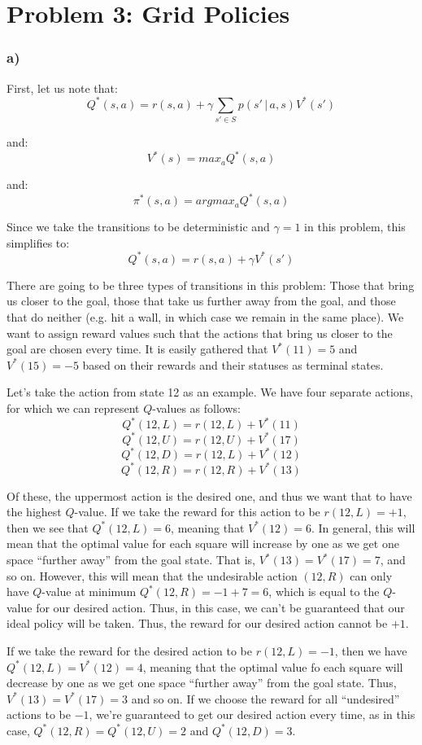 \documentclass[11pt]{scrartcl}
\begin{document}
\section*{Problem 3: Grid Policies}
\subsubsection*{a)}
First, let us note that:
$$Q^{*}(s,a) = r(s,a) + \gamma \sum_{s' \in S} p(s' \, | \, a,s) V^{*}(s')$$

and:
$$V^{*}(s) = max_{a} Q^{*}(s,a)$$

and:
$$\pi^{*}(s,a) = argmax_{a} Q^{*}(s,a)$$

Since we take the transitions to be deterministic and $\gamma = 1$ in this problem, this simplifies to:
$$Q^{*}(s,a) = r(s,a) + \gamma V^{*}(s')$$

There are going to be three types of transitions in this problem: Those that bring us closer to the goal, those that take us further away from the goal, and those that do neither (e.g. hit a wall, in which case we remain in the same place). We want to assign reward values such that the actions that bring us closer to the goal are chosen every time. It is easily gathered that $V^{*}(11) = 5$ and $V^{*}(15) = -5$ based on their rewards and their statuses as terminal states.

Let's take the action from state 12 as an example. We have four separate actions, for which we can represent $Q$-values as follows:
$$Q^{*}(12,L) = r(12,L) + V^{*}(11)$$
$$Q^{*}(12,U) = r(12,U) + V^{*}(17)$$
$$Q^{*}(12,D) = r(12,L) + V^{*}(12)$$
$$Q^{*}(12,R) = r(12,R) + V^{*}(13)$$

Of these, the uppermost action is the desired one, and thus we want that to have the highest $Q$-value. If we take the reward for this action to be $r(12,L) = +1$, then we see that $Q^{*}(12,L) = 6$, meaning that $V^{*}(12) = 6$. In general, this will mean that the optimal value for each square will increase by one as we get one space ``further away'' from the goal state. That is, $V^{*}(13) = V^{*}(17) = 7$, and so on. However, this will mean that the undesirable action $(12,R)$ can only have $Q$-value at minimum $Q^{*}(12,R) = -1 + 7 = 6$, which is equal to the $Q$-value for our desired action. Thus, in this case, we can't be guaranteed that our ideal policy will be taken. Thus, the reward for our desired action cannot be $+1$.

If we take the reward for the desired action to be $r(12,L) =  -1$, then we have $Q^{*}(12,L) = V^{*}(12) = 4$, meaning that the optimal value fo each square will decrease by one as we get one space ``further away'' from the goal state. Thus, $V^{*}(13) = V^{*}(17) = 3$ and so on. If we choose the reward for all ``undesired'' actions to be $-1$, we're guaranteed to get our desired action every time, as in this case, $Q^{*}(12,R)=Q^{*}(12,U)=2$ and $Q^{*}(12,D)=3$.
\end{document}
